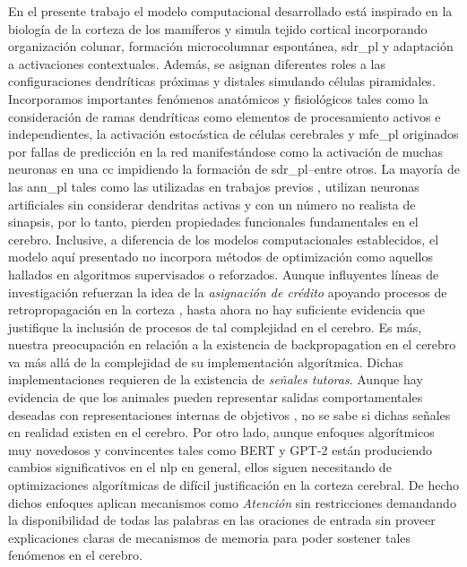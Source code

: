 En el presente trabajo el modelo computacional desarrollado está inspirado en la biología de la corteza de los mamíferos y simula tejido cortical incorporando organización colunar, formación microcolumnar espontánea, \gls{sdr_pl} y adaptación a activaciones contextuales.
Además, se asignan diferentes roles a las configuraciones dendríticas próximas y distales simulando células piramidales.
Incorporamos importantes fenómenos anatómicos y fisiológicos tales como la consideración de ramas dendríticas como elementos de procesamiento activos e independientes, la activación estocástica de células cerebrales y \gls{mfe_pl} originados por fallas de predicción en la red manifestándose como la activación de muchas neuronas en una \gls{cc} impidiendo la formación de \gls{sdr_pl}--entre otros.
La mayoría de las \gls{ann_pl} tales como las utilizadas en trabajos previos \cite{STJOHN1990217, rabovsky_modelling_2018, Dominey2009NeuralNP, michalon_meaning-driven_2019}, utilizan neuronas artificiales sin considerar dendritas activas y con un número no realista de sinapsis, por lo tanto, pierden propiedades funcionales fundamentales en el cerebro.
Inclusive, a diferencia de los modelos computacionales establecidos, el modelo aquí presentado no incorpora métodos de optimización como aquellos hallados en algoritmos supervisados o reforzados.
Aunque influyentes líneas de investigación refuerzan la idea de la \emph{asignación de crédito} apoyando procesos de retropropagación en la corteza \cite{10.7554/eLife.22901}, hasta ahora no hay suficiente evidencia que justifique la inclusión de procesos de tal complejidad en el cerebro.
Es más, nuestra preocupación en relación a la existencia de backpropagation en el cerebro va más allá de la complejidad de su implementación algorítmica.
Dichas implementaciones requieren de la existencia de \emph{señales tutoras}.
Aunque hay evidencia de que los animales pueden representar salidas comportamentales deseadas con representaciones internas de objetivos \cite{gadagkar_dopamine_2016}, no se sabe si dichas señales en realidad existen en el cerebro.
Por otro lado, aunque enfoques algorítmicos muy novedosos y convincentes tales como BERT \cite{DBLP:journals/corr/abs-1810-04805} y GPT-2 \cite{radford_language_nodate, DBLP:journals/corr/VaswaniSPUJGKP17} están produciendo cambios significativos en el \gls{nlp} en general, ellos siguen necesitando de optimizaciones algorítmicas de difícil justificación en la corteza cerebral.
De hecho dichos enfoques aplican mecanismos como \emph{Atención} sin restricciones demandando la disponibilidad de todas las palabras en las oraciones de entrada sin proveer explicaciones claras de mecanismos de memoria para poder sostener tales fenómenos en el cerebro.

